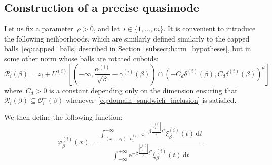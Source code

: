 \documentclass[10pt]{article}
\renewcommand{\d}{\mathrm{d}}
\newcommand{\e}{\mathrm{e}}
\newcommand{\1}{\mathbbm 1}
\newcommand{\deltaRadius}[1]{\delta^{(#1)}} %
\newcommand{\epsLimit}[1]{\alpha^{(#1)}} %
\newcommand{\localNeighborhood}[2][]{\mathcal{O}_{#2}^{#1}} %
\newcommand{\gammaPerturbation}[1]{\gamma^{(#1)}}
\newcommand{\localCuboid}[1]{\mathcal R_{#1}}
\newcommand{\hessPassage}[2][]{U^{(#2)#1}} %
\newcommand{\hessEigvec}[2]{v^{(#1)}_{#2}} %
\newcommand{\hessEigval}[2]{\nu^{(#1)}_{#2}} %
\newcommand{\fineCutoff}[1]{\xi_\beta^{(#1)}}
\newcommand{\shift}{\rho} %
\begin{document}

        \subsection{Construction of a precise quasimode}
            Let us fix a parameter~$\shift>0$, and let~$i \in \{1,\dots,m\}$.
            It is convenient to introduce the following neihborhoods, which are similarly defined similarly to the capped balls~\eqref{eq:capped_balls} described in Section~\ref{subsect:harm_hypotheses}, but in some other norm whose balls are rotated cuboids:
            \begin{equation}
                \label{eq:capped_cuboid}
               \localCuboid{i}(\beta) =  z_i + \hessPassage[]{i} \left[\left(-\infty,\frac{\epsLimit{i}}{\sqrt\beta}-\gammaPerturbation{i}(\beta)\right) \cap \left(-C_d\deltaRadius{i}(\beta),C_d\deltaRadius{i}(\beta)\right)^d\right]
            \end{equation}
            where~$C_d>0$ is a constant depending only on the dimension ensuring that~$\localCuboid{i}(\beta)\subseteq \localNeighborhood[-]{i}(\beta)$ whenever~\ref{eq:domain_sandwich_inclusion} is satisfied.

            We then define the following function:
            \begin{equation}
                \label{eq:local_quasimode}
                \varphi_\beta^{(i)}(x) = \frac{\displaystyle\int_{(x-z_i)^\intercal \hessEigvec{i}{1}}^{+\infty}\e^{-\beta \frac{|\hessEigval{i}{1}|}{2}t^2} \fineCutoff{i}(t)\,\d t}{\displaystyle\int_{-\infty}^{+\infty} \e^{-\beta\frac{|\hessEigval{i}{1}|}{2}t^2} \fineCutoff{i}(t)\,\d t},
            \end{equation}
\end{document}
